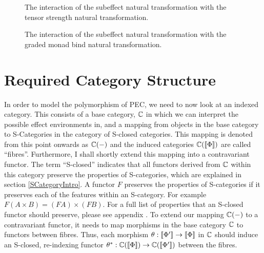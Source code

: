 \documentclass{Report}
\begin{document}
\begin{figure}
\centering
\begin{minipage}{0.45\textwidth}
    \qquad
    \caption{The interaction of the subeffect natural transformation with the tensor strength natural transformation.}
    \label{SubeffectTensorStrength}
\end{minipage}  
\quad
\begin{minipage}{0.45\textwidth}
\caption{The interaction of the subeffect natural transformation with the graded monad  bind natural transformation.}
\label{SubeffectBind}
\end{minipage}  
\end{figure}


\section{Required Category Structure}\label{PECRequirements}
In order to model the polymorphism of PEC, we need to now look at an indexed category. This consists of a base category, $\mathbb{C}$ in which we can interpret the possible effect environments in, and a mapping from objects in the base category to S-Categories in the category of S-closed categories. This mapping is denoted from this point onwards as $\mathbb{C}(-)$ and the induced categories $\mathbb{C}({\bf [\![}\Phi{\bf ]\!]})$ are called ``fibres''. Furthermore, I shall shortly extend this mapping into a contravariant functor. The term ``S-closed'' indicates that all functors derived from $\mathbb{C}$ within this category preserve the properties of S-categories, which are explained in section \ref{SCategoryIntro}. A functor $F$ preserves the properties of S-categories if it preserves each of the features within an S-category. For example $F(A\times B) = (FA)\times (FB)$. For a full list of properties that an S-closed functor should preserve, please see appendix . To extend our mapping $\mathbb{C}(-)$ to a contravariant functor, it needs to map morphisms in the base category $\mathbb{C}$ to functors between fibres.  Thus, each morphism $\theta: {\bf [\![}\Phi'{\bf ]\!]}\rightarrow{\bf [\![}\Phi{\bf ]\!]}$ in $\mathbb{C}$ should induce an S-closed, re-indexing functor $\theta^*: \mathbb{C}({\bf [\![}\Phi{\bf ]\!]})\rightarrow\mathbb{C}({\bf [\![}\Phi'{\bf ]\!]})$ between the fibres.
\end{document}
